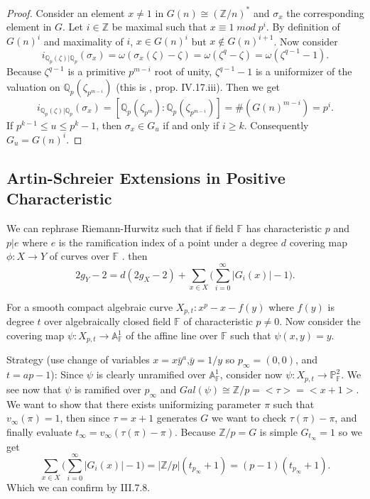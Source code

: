 \documentclass[paper=a4, fontsize=11pt]{scrartcl} %
\numberwithin{equation}{section} %
\numberwithin{figure}{section} %
\numberwithin{table}{section} %
\theoremstyle{break}
\begin{document}
\begin{proof}
Consider an element $x\not=1$ in $G(n)\cong (\mathbb{Z}/n)^*$ and $\sigma_x$ the corresponding element in $G$. Let $i\in\mathbb{Z}$ be maximal such that $x \equiv 1 \; mod\;p^i$. By definition of $G(n)^i$ and maximality of $i$, $x\in G(n)^i$ but $x\not\in G(n)^{i+1}$. Now consider
$$
i_{\mathbb{Q}_p(\zeta)|\mathbb{Q}_p}(\sigma_x) = \omega(\sigma_x(\zeta)-\zeta) = \omega(\zeta^q-\zeta)=\omega(\zeta^{q-1}-1).
$$
Because $\zeta^{q-1}$ is a primitive $p^{m-i}$ root of unity, $\zeta^{q-1}-1$ is a uniformizer of the valuation on $\mathbb{Q}_p(\zeta_{p^{m-i}})$ (this is \cite{Serre}, prop. IV.17.iii). Then we get
$$
i_{\mathbb{Q}_p(\zeta)|\mathbb{Q}_p}(\sigma_x) = [\mathbb{Q}_p(\zeta_{p^{m}}):\mathbb{Q}_p(\zeta_{p^{m-i}})]=\#(G(n)^{m-i})=p^i.
$$
If $p^{k-1} \leq u \leq p^k -1$, then $\sigma_x\in G_u$ if and only if $i\geq k$. Consequently $G_u = G(n)^i$.
\end{proof}

\subsection{Artin-Schreier Extensions in Positive Characteristic}

We can rephrase Riemann-Hurwitz such that if field $\mathbb{F}$ has characteristic $p$ and $p|e$ where $e$ is the ramification index of a point under a degree $d$ covering map $\phi:X \to Y$ of curves over $\mathbb{F}$ \cite{RnR}. then
$$
2g_Y -2 = d(2g_X -2) + \sum_{x\in X} \big( \sum^{\infty}_{i=0}|G_i(x)| -1 \big).
$$

For a smooth compact algebraic curve $X_{p,t}: x^p - x - f(y)$ where $f(y)$ is degree $t$ over algebraically closed field $\mathbb{F}$ of characteristic $p \not= 0$. Now consider the covering map $\psi: X_{p,t} \to \mathbb{A}^1_\mathbb{F}$ of the affine line over $\mathbb{F}$ such that $\psi(x,y)=y$. 

Strategy (use change of variables $x=x\bar{y}^a$,$\bar{y}=1/y$ so $p_\infty = (0,0)$, and $t=ap-1$):
Since $\psi$ is clearly unramified over $\mathbb{A}^1_\mathbb{F}$, consider now $\psi: X_{p,t} \to \mathbb{P}^2_\mathbb{F}$. We see now that $\psi$ is ramified over $p_\infty$ and $Gal(\psi)\cong \mathbb{Z}/p = <\tau>=<x+1>$. We want to show that there exists uniformizing parameter $\pi$ such that $v_\infty(\pi) = 1$, then since $\tau=x+1$ generates $G$ we want to check $\tau(\pi)-\pi$, and finally evaluate $t_\infty = v_{\infty}(\tau(\pi)-\pi)$. Because $\mathbb{Z}/p = G$ is simple $G_{t_\infty}={1}$ so we get 
$$
\sum_{x\in X} \big( \sum^{\infty}_{i=0}|G_i(x)| -1 \big) = |\mathbb{Z}/p|(t_{p_\infty} + 1)=(p-1)(t_{p_\infty} + 1).
$$
Which we can confirm by \cite{stitchenoth} III.7.8.

\clearpage
\printbibliography
\end{document}
